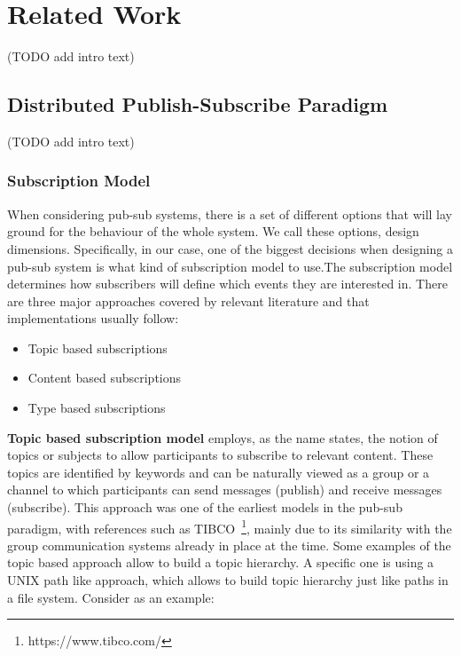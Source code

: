 
%
%

\section{Related Work}

(TODO add intro text)

\subsection{Distributed Publish-Subscribe
Paradigm}\label{distributed-publish-subscribe-paradigm}

(TODO add intro text)

\subsubsection{Subscription Model}\label{subscription-model}

When considering pub-sub systems, there is a set of different options
that will lay ground for the behaviour of the whole system. We call
these options, design dimensions. Specifically, in our case, one of the
biggest decisions when designing a pub-sub system is what kind of
subscription model to use.The subscription model determines how
subscribers will define which events they are interested in. There are
three major approaches covered by relevant literature \cite{Kermarrec2013} \cite{Eugster2003}
and that implementations usually follow:

\begin{itemize}
  \item
    Topic based subscriptions
  \item
    Content based subscriptions
  \item
    Type based subscriptions
\end{itemize}

\textbf{Topic based subscription model} employs, as the name states, the
notion of topics or subjects to allow participants to subscribe to
relevant content. These topics are identified by keywords and can be
naturally viewed as a group or a channel to which participants can send
messages (publish) and receive messages (subscribe). This approach was
one of the earliest models in the pub-sub paradigm, with references
such as TIBCO~\footnote{https://www.tibco.com/}, mainly due to its similarity with the group
communication systems already in place at the time. Some examples of the
topic based approach allow to build a topic hierarchy. A specific one is
using a UNIX path like approach, which allows to build topic hierarchy
just like paths in a file system. Consider as an example:

